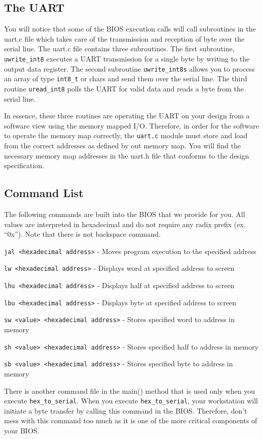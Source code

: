 \documentclass[11pt]{article}
\begin{document}
\begin{appendices}
\subsection{The UART}
You will notice that some of the BIOS execution calls will call subroutines in the uart.c file
which takes care of the transmission and reception of byte over the serial line.
The uart.c file contains three subroutines. The first subroutine, \verb|uwrite_int8| executes a
UART transmission for a single byte by writing to the output data register. The second
subroutine \verb|uwrite_int8s| allows you to process an array of type \verb|int8_t| or chars and send
them over the serial line. The third routine \verb|uread_int8| polls the UART for valid data and
reads a byte from the serial line.

In essence, these three routines are operating the UART on your design from a software view
using the memory mapped I/O. Therefore, in order for the software to operate the memory
map correctly, the \verb|uart.c| module must store and load from the correct addresses as defined
by out memory map. You will find the necessary memory map addresses in the uart.h file that
conforms to the design specification.

\subsection{Command List}
The following commands are built into the BIOS that we provide for you. All values are
interpreted in hexadecimal and do not require any radix prefix (ex. ``0x''). Note that there is not
backspace command.

\verb|jal <hexadecimal address>| - Moves program execution to the specified address

\verb|lw <hexadecimal address>| - Displays word at specified address to screen

\verb|lhu <hexadecimal address>| - Displays half at specified address to screen

\verb|lbu <hexadecimal address>| - Displays byte at specified address to screen

\verb|sw <value> <hexadecimal address>| - Stores specified word to address in memory

\verb|sh <value> <hexadecimal address>| - Stores specified half to address in memory

\verb|sb <value> <hexadecimal address>| - Stores specified byte to address in memory

There is another command file in the main() method that is used only when you execute
\verb|hex_to_serial|. When you execute \verb|hex_to_serial|, your workstation will initiate a byte
transfer by calling this command in the BIOS. Therefore, don’t mess with this command too
much as it is one of the more critical components of your BIOS.


\end{appendices}
\end{document}
